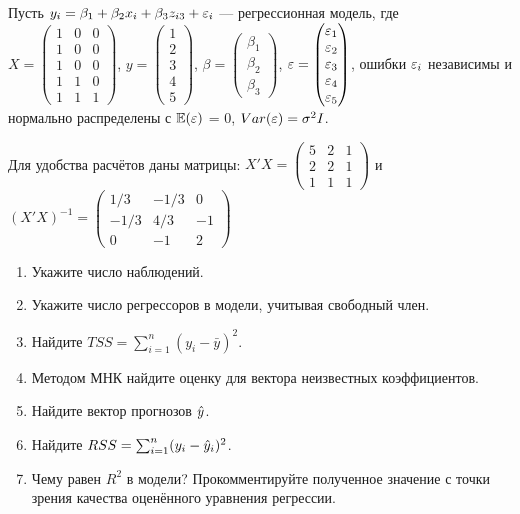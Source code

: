 \begin{problem}
Пусть $y_i = \beta_1 + \beta_2 x_{i} + \beta_3 z_{i3} + \varepsilon_i$ — регрессионная модель, 
где $X = \begin{pmatrix} 1 & 0 & 0 \\ 1 & 0 & 0 \\ 1 & 0 & 0 \\ 1 & 1 & 0 \\ 1 & 1 & 1 \end{pmatrix}$, 
$y = \begin{pmatrix} 1 \\ 2 \\ 3 \\ 4 \\ 5 \end{pmatrix}$, 
$\beta = \begin{pmatrix} \beta_1 \\ \beta_2 \\ \beta_3 \end{pmatrix}$, 
$\varepsilon = \begin{pmatrix} \varepsilon_1 \\ \varepsilon_2 \\ \varepsilon_3 \\ \varepsilon_4 \\ \varepsilon_5  \end{pmatrix}$, ошибки 
$\varepsilon_i$ независимы и нормально распределены с $\operatorname{\mathbb E}(\varepsilon)$ = 0, $Var(\varepsilon) = \sigma^2 I$. 

Для удобства расчётов даны матрицы: $X'X = \begin{pmatrix} 5 & 2 & 1 \\ 2 & 2 & 1\\ 1 & 1 & 1 \end{pmatrix}$ и 
$(X'X)^{-1}= \begin{pmatrix} 1/3 & -1/3 & 0 \\ -1/3 & 4/3 & -1 \\ 0 & -1 & 2 \end{pmatrix}$


\begin{enumerate}
\item Укажите число наблюдений.
\item Укажите число регрессоров в модели, учитывая свободный член.
\item Найдите $TSS = \sum_{i=1}^n (y_i - \bar y)^2$.
\item Методом МНК найдите оценку для вектора неизвестных коэффициентов.
\item Найдите вектор прогнозов $\hat{y}$.
\item Найдите $RSS = \sum_{i=1}^n (y_i - \hat{y}_i)^2$.
\item Чему равен $R^2$ в модели? Прокомментируйте полученное значение с точки зрения качества оценённого уравнения регрессии.\end{enumerate}
\begin{sol}


\end{sol}
\end{problem}
